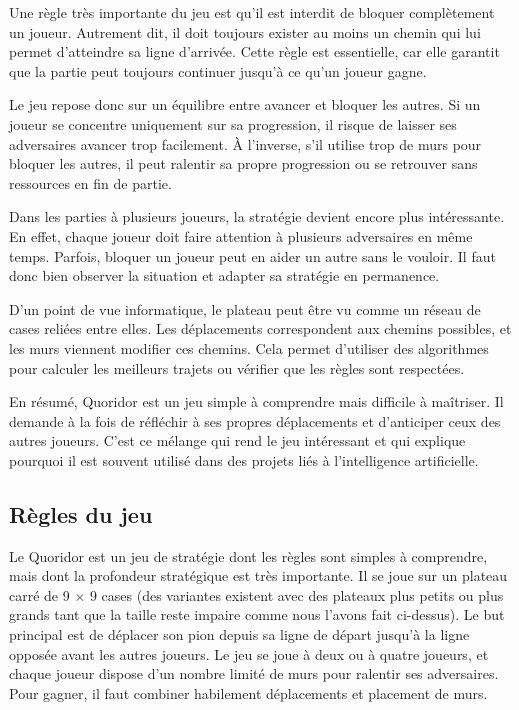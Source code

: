 \documentclass[a4paper]{article}
\begin{document}
Une règle très importante du jeu est qu’il est interdit de bloquer complètement un joueur. Autrement dit, il doit toujours exister au moins un chemin qui lui permet d’atteindre sa ligne d’arrivée. Cette règle est essentielle, car elle garantit que la partie peut toujours continuer jusqu’à ce qu’un joueur gagne.

Le jeu repose donc sur un équilibre entre avancer et bloquer les autres. Si un joueur se concentre uniquement sur sa progression, il risque de laisser ses adversaires avancer trop facilement. À l’inverse, s’il utilise trop de murs pour bloquer les autres, il peut ralentir sa propre progression ou se retrouver sans ressources en fin de partie.

Dans les parties à plusieurs joueurs, la stratégie devient encore plus intéressante. En effet, chaque joueur doit faire attention à plusieurs adversaires en même temps. Parfois, bloquer un joueur peut en aider un autre sans le vouloir. Il faut donc bien observer la situation et adapter sa stratégie en permanence.

D’un point de vue informatique, le plateau peut être vu comme un réseau de cases reliées entre elles. Les déplacements correspondent aux chemins possibles, et les murs viennent modifier ces chemins. Cela permet d’utiliser des algorithmes pour calculer les meilleurs trajets ou vérifier que les règles sont respectées.

En résumé, Quoridor est un jeu simple à comprendre mais difficile à maîtriser. Il demande à la fois de réfléchir à ses propres déplacements et d’anticiper ceux des autres joueurs. C’est ce mélange qui rend le jeu intéressant et qui explique pourquoi il est souvent utilisé dans des projets liés à l’intelligence artificielle.
\subsection{Règles du jeu}

Le Quoridor est un jeu de stratégie dont les règles sont simples à comprendre, mais dont la profondeur stratégique est très importante. Il se joue sur un plateau carré de 9 × 9 cases (des variantes existent avec des plateaux plus petits ou plus grands tant que la taille reste impaire comme nous l'avons fait ci-dessus). Le but principal est de déplacer son pion depuis sa ligne de départ jusqu’à la ligne opposée avant les autres joueurs. Le jeu se joue à deux ou à quatre joueurs, et chaque joueur dispose d’un nombre limité de murs pour ralentir ses adversaires. Pour gagner, il faut combiner habilement déplacements et placement de murs.
\end{document}
